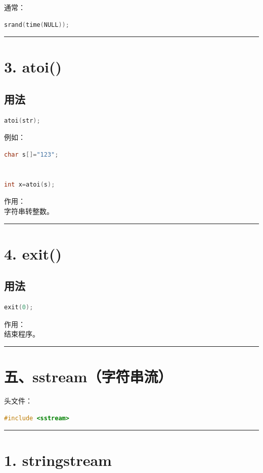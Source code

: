 \documentclass[10pt,twocolumn]{extarticle}
\begin{document}
通常：
\begin{lstlisting}[language=C++]
srand(time(NULL));
\end{lstlisting}

\noindent\rule{\linewidth}{0.4pt}

\section{3. atoi()}

\subsection{用法}
\begin{lstlisting}[language=C++]
atoi(str);
\end{lstlisting}
例如：
\begin{lstlisting}[language=C++]
char s[]="123";


int x=atoi(s);
\end{lstlisting}
作用：\\
字符串转整数。

\noindent\rule{\linewidth}{0.4pt}

\section{4. exit()}

\subsection{用法}
\begin{lstlisting}[language=C++]
exit(0);
\end{lstlisting}
作用：\\
结束程序。

\noindent\rule{\linewidth}{0.4pt}

\section{五、sstream（字符串流）}

头文件：
\begin{lstlisting}[language=C++]
#include <sstream>
\end{lstlisting}

\noindent\rule{\linewidth}{0.4pt}

\section{1. stringstream}
\end{document}
